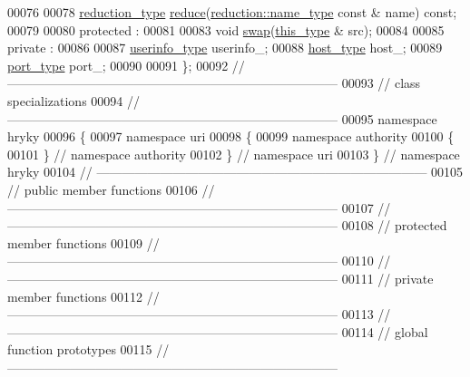 \begin{DoxyCode}
00076 
00078     \hyperlink{classhryky_1_1_intrusive_ptr}{reduction_type} \hyperlink{classhryky_1_1uri_1_1authority_1_1_entity_aef5d2bf58a4db5254757eda09dc69cdb}{reduce}(\hyperlink{classhryky_1_1reduction_1_1_string}{reduction::name_type} \textcolor{keyword}{const} & name) \textcolor{keyword}{const};
00079 
00080 \textcolor{keyword}{protected} :
00081 
00083     \textcolor{keywordtype}{void} \hyperlink{classhryky_1_1uri_1_1authority_1_1_entity_ab0d4bcdb587b69e7dbc2242d60fa65ef}{swap}(\hyperlink{classhryky_1_1uri_1_1authority_1_1_entity}{this_type} & src);
00084 
00085 \textcolor{keyword}{private} :
00086 
00087     \hyperlink{classhryky_1_1uri_1_1userinfo_1_1_entity}{userinfo_type}   userinfo\_;
00088     \hyperlink{classhryky_1_1uri_1_1host_1_1_entity}{host_type}       host\_;
00089     \hyperlink{classhryky_1_1uri_1_1port_1_1_entity}{port_type}       port\_;
00090 
00091 \};
00092 \textcolor{comment}{//
      ------------------------------------------------------------------------------}
00093 \textcolor{comment}{// class specializations}
00094 \textcolor{comment}{//
      ------------------------------------------------------------------------------}
00095 \textcolor{keyword}{namespace }hryky
00096 \{
00097 \textcolor{keyword}{namespace }uri
00098 \{
00099 \textcolor{keyword}{namespace }authority
00100 \{
00101 \} \textcolor{comment}{// namespace authority}
00102 \} \textcolor{comment}{// namespace uri}
00103 \} \textcolor{comment}{// namespace hryky}
00104 \textcolor{comment}{//
      ------------------------------------------------------------------------------}
00105 \textcolor{comment}{// public member functions}
00106 \textcolor{comment}{//
      ------------------------------------------------------------------------------}
00107 \textcolor{comment}{//
      ------------------------------------------------------------------------------}
00108 \textcolor{comment}{// protected member functions}
00109 \textcolor{comment}{//
      ------------------------------------------------------------------------------}
00110 \textcolor{comment}{//
      ------------------------------------------------------------------------------}
00111 \textcolor{comment}{// private member functions}
00112 \textcolor{comment}{//
      ------------------------------------------------------------------------------}
00113 \textcolor{comment}{//
      ------------------------------------------------------------------------------}
00114 \textcolor{comment}{// global function prototypes}
00115 \textcolor{comment}{//
      ------------------------------------------------------------------------------}

\end{DoxyCode}
